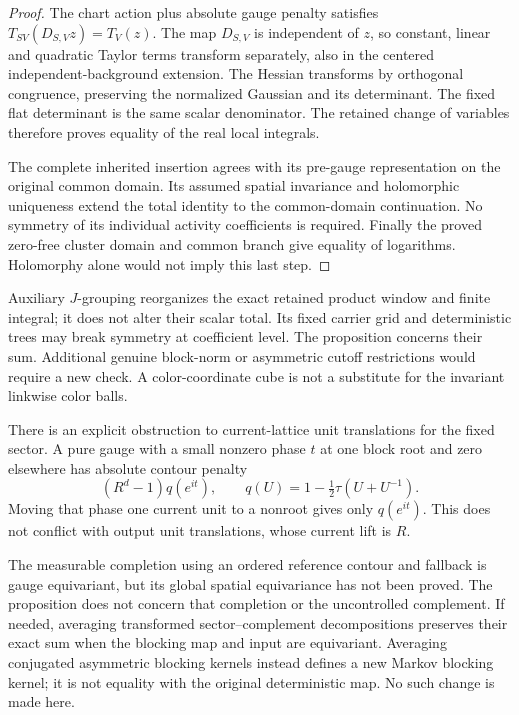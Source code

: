 \documentclass[11pt]{article}
\theoremstyle{remark}
\begin{document}
\begin{proof}
The chart action plus absolute gauge penalty satisfies
\(T_{SV}(D_{S,V}z)=T_V(z)\). The map \(D_{S,V}\) is independent
of \(z\), so constant, linear and quadratic Taylor terms transform
separately, also in the centered independent-background extension.
The Hessian transforms by orthogonal congruence, preserving the
normalized Gaussian and its determinant. The fixed flat determinant
is the same scalar denominator. The retained change of variables
therefore proves equality of the real local integrals.

The complete inherited insertion agrees with its pre-gauge
representation on the original common domain. Its assumed
spatial invariance and holomorphic uniqueness extend the total
identity to the common-domain continuation. No symmetry of its
individual activity coefficients is required. Finally the proved
zero-free cluster domain and common branch give equality of
logarithms. Holomorphy alone would not imply this last step.
\end{proof}

Auxiliary \(J\)-grouping reorganizes the exact retained product
window and finite integral; it does not alter their scalar total.
Its fixed carrier grid and deterministic trees may break symmetry
at coefficient level. The proposition concerns their sum.
Additional genuine block-norm or asymmetric cutoff restrictions
would require a new check. A color-coordinate cube is not a
substitute for the invariant linkwise color balls.

There is an explicit obstruction to current-lattice unit
translations for the fixed sector. A pure gauge with a small
nonzero phase \(t\) at one block root and zero elsewhere has
absolute contour penalty
\[
 (R^d-1)q(e^{it}),\qquad
 q(U)=1-\tfrac12\tau(U+U^{-1}).
\]
Moving that phase one current unit to a nonroot gives only
\(q(e^{it})\). This does not conflict with output unit translations,
whose current lift is \(R\).

The measurable completion using an ordered reference contour and
fallback is gauge equivariant, but its global spatial equivariance
has not been proved. The proposition does not concern that
completion or the uncontrolled complement. If needed, averaging
transformed sector--complement decompositions preserves their
exact sum when the blocking map and input are equivariant.
Averaging conjugated asymmetric blocking kernels instead defines
a new Markov blocking kernel; it is not equality with the original
deterministic map. No such change is made here.
\end{document}
